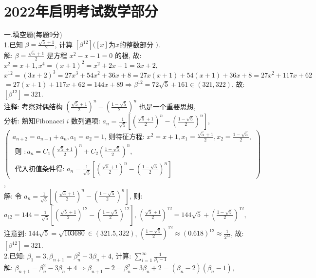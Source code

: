 \documentclass[a4paper,11pt,UTF8]{article}
\begin{document}
\section*{2022年启明考试数学部分}
\noindent
一.填空题(每题9分)\\
1.已知 $\displaystyle\beta=\frac{\sqrt{5}+1}{2}$, 计算 $\left[\beta^{12}\right]([x]$为$x$的整数部分 $)$.\\
解: $\displaystyle\beta=\frac{\sqrt{5}+1}{2}$ 是方程 $x^2-x-1=0$ 的根, 故: $x^2=x+1, x^4=(x+1)^2=x^2+2 x+1=3 x+2$, $x^{12}=(3 x+2)^3=27 x^3+54 x^2+36 x+8=27 x(x+1)+54(x+1)+36 x+8=27 x^2+117 x+62$ $=27(x+1)+117 x+62=144 x+89 \Rightarrow \beta^{12}=72 \sqrt{5}+161 \in(321,322)$, 故: $\left[\beta^{12}\right]=321$.\\
注释: 考察对偶结构 $\displaystyle\left(\frac{\sqrt{5}+1}{2}\right)^n-\left(\frac{1-\sqrt{5}}{2}\right)^n$ 也是一个重要思想,\\
分析: 熟知Fibonacci $i$ 数列通项: $\displaystyle a_n=\frac{1}{\sqrt{5}}\left[\left(\frac{\sqrt{5}+1}{2}\right)^n-\left(\frac{1-\sqrt{5}}{2}\right)^n\right]$,\\
$\displaystyle\left(\begin{array}{l}\displaystyle a_{n+2}=a_{n+1}+a_n, a_1=a_2=1 \text {, 则特征方程: } x^2=x+1, x_1=\frac{\sqrt{5}+1}{2}, x_2=\frac{1-\sqrt{5}}{2}, \\ \text { 则 }: \displaystyle a_n=C_1\left(\frac{\sqrt{5}+1}{2}\right)^n+C_2\left(\frac{1-\sqrt{5}}{2}\right)^n,\\
\text { 代入初值条件得: } \displaystyle a_n=\frac{1}{\sqrt{5}}\left[\left(\frac{\sqrt{5}+1}{2}\right)^n-\left(\frac{1-\sqrt{5}}{2}\right)^n\right]\end{array}\right)$,\\
解: 令 $\displaystyle a_n=\frac{1}{\sqrt{5}}\left[\left(\frac{\sqrt{5}+1}{2}\right)^n-\left(\frac{1-\sqrt{5}}{2}\right)^n\right]$, 则:\\ $\displaystyle a_{12}=144=\frac{1}{\sqrt{5}}\left[\left(\frac{\sqrt{5}+1}{2}\right)^{12}-\left(\frac{1-\sqrt{5}}{2}\right)^{12}\right]$,
$\displaystyle\left(\frac{\sqrt{5}+1}{2}\right)^{12}=144 \sqrt{5}+\left(\frac{1-\sqrt{5}}{2}\right)^{12}$, 注意到: $144 \sqrt{5}=\sqrt{103680} \in(321.5,322)$,
$\left(\frac{1-\sqrt{5}}{2}\right)^{12} \approx(0.618)^{12} \approx \frac{1}{2^{12}}$, 故: $\left[\beta^{12}\right]=321 . $\\
2.已知: $\beta_1=3, \beta_{n+1}=\beta_n^2-3 \beta_n+4$, 计算: $\displaystyle\sum_{i=1}^{\infty} \frac{1}{\beta_i-1}$\\
解: $\beta_{n+1}=\beta_n^2-3 \beta_n+4 \Rightarrow \beta_{n+1}-2=\beta_n^2-3 \beta_n+2=\left(\beta_n-2\right)\left(\beta_n-1\right)$,\\
\end{document}
